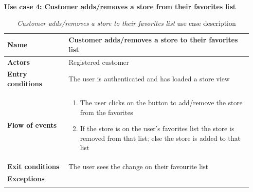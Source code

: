 \clearpage
\textbf{Use case 4: Customer adds/removes a store from their favorites list}
\smallskip
{}
\begin{longtable}{p{0.25\linewidth}p{0.75\linewidth}}
    \toprule
    \textbf{Name}             & \textbf{Customer adds/removes a store to their favorites list} \\
    \midrule
    \textbf{Actors}           & Registered customer                                            \\
    \midrule
    \textbf{Entry conditions} & The user is authenticated and has loaded a store view          \\
    \midrule
    \textbf{Flow of events}   &
    \begin{enumerate}
        \item The user clicks on the button to add/remove the store from the favorites
        \item If the store is on the user's favorites list the store is removed from that list; else the store is added to that list
    \end{enumerate}                                                                 \\
    \midrule
    \textbf{Exit conditions}  & The user sees the change on their favourite list               \\
    \midrule
    \textbf{Exceptions}       &                                                                \\
    \bottomrule
    \caption{\emph{Customer adds/removes a store to their favorites list} use case description}
\end{longtable}


